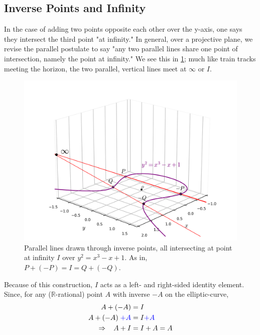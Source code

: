 \documentclass[11pt, a4paper]{report}
\newcommand{\reals}{\mathbb{R}}
\begin{document}
\subsection{Inverse Points and Infinity}

In the case of adding two points opposite each other over the y-axis, one says they intersect the third point "at infinity." In general, over a projective plane, we revise the parallel postulate to say "any two parallel lines share one point of intersection, namely the point at infinity." We see this in \ref{fig:3dproj}; much like train tracks meeting the horizon, the two parallel, vertical lines meet at $\infty$ or $I$. 

\begin{figure}[h]
\begin{center}
\includegraphics[width=\linewidth]{3dplot.png} 
\caption{Parallel lines drawn through inverse points, all intersecting at point at infinity $I$ over $y^2=x^3 - x + 1$. As in, $P + (-P) = I = Q + (-Q)$.}
\label{fig:3dproj}
\end{center}
\end{figure}

Because of this construction, $I$ acts as a left- and right-sided identity element. Since, for any ($\reals$-rational) point $A$ with inverse $-A$ on the elliptic-curve,
\begin{align*}
  A + (-A) &= I\\
  A + (-A)\; \color{blue}{+ A} &= I \color{blue}{+ A}\\
  \Rightarrow \hspace*{0.3cm} A + I &= I + A = A
\end{align*}
\end{document}
